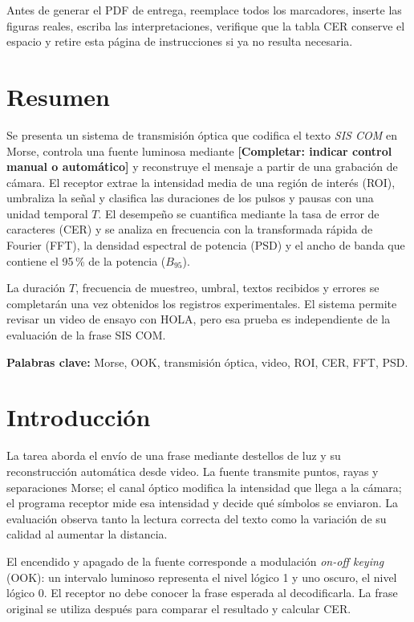 \documentclass[11pt,a4paper]{article}
\newcommand{\Completar}[1]{\textcolor{Pending}{\textbf{[Completar: #1]}}}
\begin{document}
Antes de generar el PDF de entrega, reemplace todos los marcadores, inserte las figuras reales, escriba las interpretaciones, verifique que la tabla CER conserve el espacio y retire esta página de instrucciones si ya no resulta necesaria.

\section*{Resumen}
Se presenta un sistema de transmisión óptica que codifica el texto \textit{SIS COM} en Morse, controla una fuente luminosa mediante \textbf{\Completar{indicar control manual o automático}} y reconstruye el mensaje a partir de una grabación de cámara. El receptor extrae la intensidad media de una región de interés (ROI), umbraliza la señal y clasifica las duraciones de los pulsos y pausas con una unidad temporal \(T\). El desempeño se cuantifica mediante la tasa de error de caracteres (CER) y se analiza en frecuencia con la transformada rápida de Fourier (FFT), la densidad espectral de potencia (PSD) y el ancho de banda que contiene el 95\,\% de la potencia (\(B_{95}\)).

La duración \(T\), frecuencia de muestreo, umbral, textos recibidos y errores se completarán una vez obtenidos los registros experimentales. El sistema permite revisar un video de ensayo con HOLA, pero esa prueba es independiente de la evaluación de la frase SIS COM.

\textbf{Palabras clave:} Morse, OOK, transmisión óptica, video, ROI, CER, FFT, PSD.

\clearpage
\tableofcontents
\clearpage
\listoffigures
\clearpage
{}

\section{Introducción}
La tarea aborda el envío de una frase mediante destellos de luz y su reconstrucción automática desde video. La fuente transmite puntos, rayas y separaciones Morse; el canal óptico modifica la intensidad que llega a la cámara; el programa receptor mide esa intensidad y decide qué símbolos se enviaron. La evaluación observa tanto la lectura correcta del texto como la variación de su calidad al aumentar la distancia.

El encendido y apagado de la fuente corresponde a modulación \textit{on-off keying} (OOK): un intervalo luminoso representa el nivel lógico 1 y uno oscuro, el nivel lógico 0. El receptor no debe conocer la frase esperada al decodificarla. La frase original se utiliza después para comparar el resultado y calcular CER.
\end{document}
